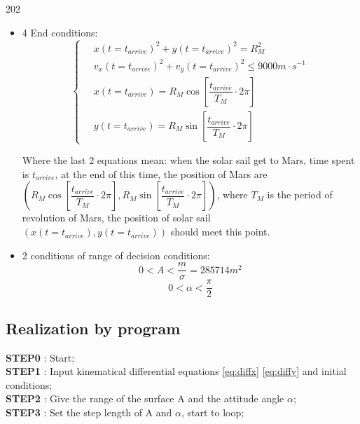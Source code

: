 \documentclass[../Paper.tex]{subfiles}
\begin{document}
\begin{dingautolist}{202}
\begin{itemize}
\item 
4 End conditions:
\begin{equation*}
\left\{\begin{array}{ll}
~& x(t=t_{arrive})^2 + y(t=t_{arrive})^2 = R_{M}^2\\[2mm]
~& v_{x}(t=t_{arrive})^2 + v_{y}(t=t_{arrive})^2 \leq 9000 m \cdot s^{-1} \\[2mm]
~& x(t=t_{arrive}) = R_{M} \cos{ \left[ \dfrac{t_{arrive}}{T_{M}} \cdot 2\pi \right] } \\[2mm]
~& y(t=t_{arrive}) = R_{M} \sin{ \left[ \dfrac{t_{arrive}}{T_{M}} \cdot 2\pi \right] }
\end{array}\right.
\end{equation*}

Where the last 2 equations mean: when the solar sail get to Mars, time spent is $ t_{arrive} $,
at the end of this time, the position of Mars are  
$ \left( R_{M} \cos{ \left[ \dfrac{t_{arrive}}{T_{M}} \cdot 2\pi \right] } ,
 R_{M} \sin{ \left[ \dfrac{t_{arrive}}{T_{M}} \cdot 2\pi \right] } \right) $, 
where $ T_{M} $ is the period of revolution of Mars, the position of solar sail $( x(t=t_{arrive}) , y(t=t_{arrive}) )$ 
should meet this point.

\item 
2 conditions of range of decision conditions:
$$ 0 < A < \dfrac{m}{\sigma} = 285714m^2 $$
$$ 0 < \alpha < \dfrac{\pi}{2} $$
\end{itemize}

\end{dingautolist}

\subsection{Realization by program}


\textbf{STEP0} : Start;\\[1mm]

\textbf{STEP1} : Input kinematical differential equations \eqref{eq:diffx} \eqref{eq:diffy} and initial conditions;\\[1mm]

\textbf{STEP2} : Give the range of the surface A and the attitude angle $\alpha$;\\[1mm]

\textbf{STEP3} : Set the step length of A and $\alpha$, start to loop;\\[1mm]
\end{document}

